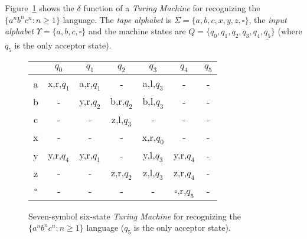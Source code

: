 \documentclass[letterpaper]{article} %
\begin{document}
Figure~\ref{tab:tm-anbncn} shows the $\delta$ function of a {\em Turing Machine} for recognizing the $\{a^nb^nc^n : n \geq 1 \}$ language. The {\em tape alphabet} is $\Sigma=\{a,b,c,x,y,z,\square\}$, the {\em input alphabet} $\Upsilon=\{a,b,c,\square\}$ and the machine states are $Q=\{q_0,q_1,q_2,q_3,q_4,\underline{q_5}\}$ (where \underline{$q_5$} is the only acceptor state).

\begin{figure}
\begin{center}
    \begin{tabular}{| c || c | c | c | c | c | c |}
    \hline
      & $q_0$ & $q_1$ & $q_2$ & $q_3$ & $q_4$ & \underline{$q_5$} \\ \hline\hline
    a & x,r,$q_1$ & a,r,$q_1$ & - &  a,l,$q_3$ & - & - \\ \hline
    b & - & y,r,$q_2$ & b,r,$q_2$ & b,l,$q_3$ & - & - \\ \hline
    c & - & - & z,l,$q_3$ & - & - & - \\ \hline
    x & - & - & - & x,r,$q_0$ & - & - \\ \hline
    y & y,r,$q_4$ & y,r,$q_1$ & - & y,l,$q_3$ & y,r,$q_4$ & - \\ \hline
    z & - & - & z,r,$q_2$ & z,l,$q_3$ & z,r,$q_4$ & - \\\hline
    $\square$ & - & - & - & - & $\square$,r,$q_5$  & - \\                
    \hline
    \end{tabular}
\end{center}
  \caption{\small Seven-symbol six-state {\em Turing Machine} for recognizing the $\{a^nb^nc^n : n \geq 1 \}$ language (\underline{$q_5$} is the only acceptor state).}
  \label{tab:tm-anbncn}
\end{figure}
\end{document}
